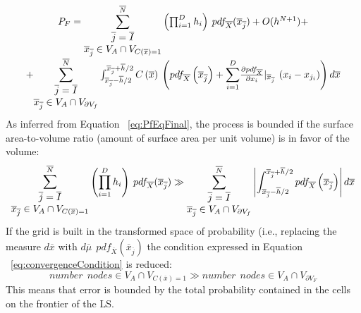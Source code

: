  \begin{equation}
 \label{eq:PfEqFinal}
 \begin{matrix}
P_{F} = \mathlarger{\sum}_{\begin{matrix}
\overline{j}=\overline{I} \\ \overline{x}_{\overline{j}} \in V_{A} \cap
V_{C(\overline{x})=1} \end{matrix}}^{\overline{N}}
\left ( \prod_{i=1}^{D}
 h_{i} \right )
\: pdf_{\overline{X}} ( \overline{x}_{\overline{j}}) + O(h^{N+1}) +
 \\
 + \mathlarger{\sum}_{\begin{matrix}
\overline{j}=\overline{I} \\ \overline{x}_{\overline{j}} \in V_{A} \cap
V_{\partial V_{f}} \end{matrix}}^{\overline{N}}
\int_{\overline{x}_{\overline{j}} -
\overline{h}/2}^{\overline{x}_{\overline{j}} + \overline{h}/2} C\left (
\overline{x} \right )\: \left ( pdf_{\overline{X}}\left (
\overline{x}_{\overline{j}} \right ) +
\mathlarger{\sum}_{i=1}^{D} \frac{\partial pdf_{\overline{X}}}{\partial
x_{i}}|_{\overline{x}_{\overline{j}}} \: \left ( x_{i} - x_{j_{i}} \right ) \right )
d\overline{x}
\end{matrix}
 \end{equation}
As inferred from Equation ~\ref{eq:PfEqFinal}, the process is bounded if the
surface area-to-volume ratio (amount of surface area per unit volume) is
in favor of the volume:
\begin{equation}
\label{eq:convergenceCondition}
\mathlarger{\sum}_{\begin{matrix}
\overline{j}=\overline{I} \\ \overline{x}_{\overline{j}} \in V_{A} \cap
V_{C(\overline{x})=1} \end{matrix}}^{\overline{N}}
\left ( \prod_{i=1}^{D}
 h_{i} \right )
\: pdf_{\overline{X}} ( \overline{x}_{\overline{j}})
\gg
\sum_{\begin{matrix}
\overline{j}=\overline{I} \\ \overline{x}_{\overline{j}} \in V_{A} \cap
V_{\partial V_{f}} \end{matrix}}^{\overline{N}}
\left | \int_{\overline{x}_{\overline{j}} -
\overline{h}/2}^{\overline{x}_{\overline{j}} + \overline{h}/2}   pdf_{\overline{X}}\left (
\overline{x}_{\overline{j}} \right )  \right |
d\overline{x}
\end{equation}
If the grid is built in the transformed space of probability (i.e., replacing the measure $d\overline{x}$ with $d \overline{\mu }\: \: pdf_{\overline{X}}\left ( \overline{x}_{\overline{j}} \right )$ the condition expressed in Equation ~\ref{eq:convergenceCondition} is reduced:
\begin{equation}
number \: \:  nodes \in V_{A} \cap V_{C(\overline{x})=1} \gg number \: \:  nodes  \in V_{A} \cap V_{\partial V_{F}}
\end{equation}
This means that error is bounded by the total probability contained in the cells on the frontier of the LS.


